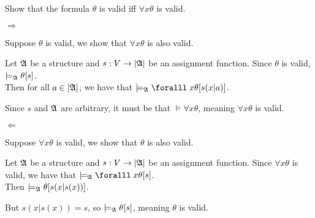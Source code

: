 \begin{problem}[6]
  Show that the formula $\theta$ is valid iff $\forall x \theta$ is valid.
\end{problem}
\begin{Answer}
  $\Longrightarrow$

  \step
  Suppose $\theta$ is valid, we show that $\forall x \theta$ is also valid.

  \step
  Let $\mathfrak{A}$ be a structure and $s : V \rightarrow \lvert\mathfrak{A}\rvert$ be an assignment function.
  Since $\theta$ is valid, $\models_{\mathfrak{A}} \theta [s]$.\\
  Then for all $a \in \lvert\mathfrak{A}\rvert$, we have that $\models_{\frakA} \forall x \theta [s (x|a)]$.

  \step
  Since $s$ and $\mathfrak{A}$ are arbitrary, it must be that $\models \forall x \theta$,
  meaning $\forall x \theta$ is valid.

  \step
  $\Longleftarrow$

  \step
  Suppose $\forall x \theta$ is valid, we show that $\theta$ is also valid.

  \step
  Let $\mathfrak{A}$ be a structure and $s : V \rightarrow \lvert\mathfrak{A}\rvert$ be an assignment function.
  Since $\forall x \theta$ is valid, we have that $\models_{\frakA} \forall x \theta [s]$.\\
  Then $\models_{\mathfrak{A}} \theta [s(x | s(x))]$.

  \step
  But $s(x | s(x)) = s$, so $\models_{\mathfrak{A}} \theta [s]$, meaning $\theta$ is valid.
\end{Answer}
